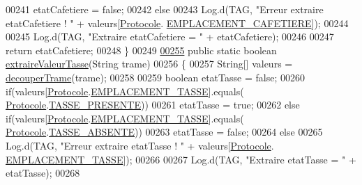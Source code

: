 \begin{DoxyCode}
00241             etatCafetiere = \textcolor{keyword}{false};
00242         \textcolor{keywordflow}{else}
00243             Log.d(TAG, \textcolor{stringliteral}{"Erreur extraire etatCafetiere ! "} + valeurs[\hyperlink{classcom_1_1example_1_1ekawa_1_1_protocole}{Protocole}.
      \hyperlink{classcom_1_1example_1_1ekawa_1_1_protocole_af6d747772dbddcd7e7b76745174645f0}{EMPLACEMENT\_CAFETIERE}]);
00244 
00245         Log.d(TAG, \textcolor{stringliteral}{"Extraire etatCafetiere = "} + etatCafetiere);
00246 
00247         \textcolor{keywordflow}{return} etatCafetiere;
00248     \}
00249 
\hyperlink{classcom_1_1example_1_1ekawa_1_1_protocole_ae5e80461f082b4d2e469ee6841b9a380}{00255}     \textcolor{keyword}{public} \textcolor{keyword}{static} \textcolor{keywordtype}{boolean} \hyperlink{classcom_1_1example_1_1ekawa_1_1_protocole_ae5e80461f082b4d2e469ee6841b9a380}{extraireValeurTasse}(String trame)
00256     \{
00257         String[] valeurs = \hyperlink{classcom_1_1example_1_1ekawa_1_1_protocole_a23c261e4ab5ad3c2ac60187f04ae40ea}{decouperTrame}(trame);
00258 
00259         \textcolor{keywordtype}{boolean} etatTasse = \textcolor{keyword}{false};
00260         \textcolor{keywordflow}{if}(valeurs[\hyperlink{classcom_1_1example_1_1ekawa_1_1_protocole}{Protocole}.\hyperlink{classcom_1_1example_1_1ekawa_1_1_protocole_a2ca3da411b9d68caf3ac2ff0cdf55216}{EMPLACEMENT\_TASSE}].equals(
      \hyperlink{classcom_1_1example_1_1ekawa_1_1_protocole}{Protocole}.\hyperlink{classcom_1_1example_1_1ekawa_1_1_protocole_a2f969365d74ec301bc9d76fb992ed9e6}{TASSE\_PRESENTE}))
00261             etatTasse = \textcolor{keyword}{true};
00262         \textcolor{keywordflow}{else} \textcolor{keywordflow}{if}(valeurs[\hyperlink{classcom_1_1example_1_1ekawa_1_1_protocole}{Protocole}.\hyperlink{classcom_1_1example_1_1ekawa_1_1_protocole_a2ca3da411b9d68caf3ac2ff0cdf55216}{EMPLACEMENT\_TASSE}].equals(
      \hyperlink{classcom_1_1example_1_1ekawa_1_1_protocole}{Protocole}.\hyperlink{classcom_1_1example_1_1ekawa_1_1_protocole_aec2265bfb60660cbf5dfb716f694bcfb}{TASSE\_ABSENTE}))
00263             etatTasse = \textcolor{keyword}{false};
00264         \textcolor{keywordflow}{else}
00265             Log.d(TAG, \textcolor{stringliteral}{"Erreur extraire etatTasse ! "} + valeurs[\hyperlink{classcom_1_1example_1_1ekawa_1_1_protocole}{Protocole}.
      \hyperlink{classcom_1_1example_1_1ekawa_1_1_protocole_a2ca3da411b9d68caf3ac2ff0cdf55216}{EMPLACEMENT\_TASSE}]);
00266 
00267         Log.d(TAG, \textcolor{stringliteral}{"Extraire etatTasse = "} + etatTasse);
00268 

\end{DoxyCode}
